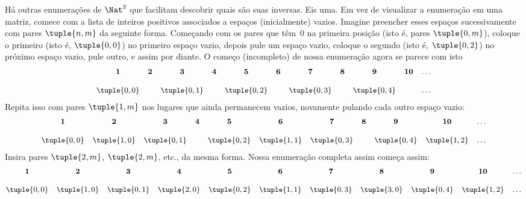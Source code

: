 \documentclass[../../../include/open-logic-section]{subfiles}
\begin{document}


\begin{explain}
Há outras enumerações de $\Nat^2$ que facilitam descobrir
quais são suas inversas. Eis uma. Em vez de
visualizar a enumeração em uma matriz, comece com a lista de
inteiros positivos associados a espaços (inicialmente) vazios. Imagine
preencher esses espaços sucessivamente com pares $\tuple{n,m}$ da seguinte forma.
Começando com os pares que têm~$0$ na primeira posição (isto é, pares
$\tuple{0,m}$), coloque o primeiro (isto é, $\tuple{0,0}$) no primeiro espaço vazio,
depois pule um espaço vazio, coloque o segundo (isto é, $\tuple{0,2}$)
no próximo espaço vazio, pule outro, e assim por diante. O
começo (incompleto) de nossa enumeração agora se parece com isto
\[\small
\begin{array}{@{}c c c c c c c c c c c@{}}
\mathbf 1 & \mathbf 2 & \mathbf 3 & \mathbf 4 & \mathbf 5 & \mathbf 6 & \mathbf 7 & \mathbf 8 & \mathbf 9 & \mathbf{10} & \dots \\ \\
\tuple{0,0} &  & \tuple{0,1} &  & \tuple{0,2} &  & \tuple{0,3} & & \tuple{0,4} &  & \dots \\
\end{array}
\]
Repita isso com pares $\tuple{1,m}$ nos lugares que ainda permanecem
vazios, novamente pulando cada outro espaço vazio:
\[\small
\begin{array}{@{}c c c c c c c c c c c@{}}
\mathbf 1 & \mathbf 2 & \mathbf 3 & \mathbf 4 & \mathbf 5 & \mathbf 6 & \mathbf 7 & \mathbf 8 & \mathbf 9 & \mathbf{10} & \dots \\ \\
\tuple{0,0} & \tuple{1,0} & \tuple{0,1} &  & \tuple{0,2} & \tuple{1,1} & 
\tuple{0,3} & & \tuple{0,4} &  \tuple{1,2} & \dots \\
\end{array}
\]
Insira pares $\tuple{2,m}$, $\tuple{2,m}$, etc., da mesma forma. Nossa
enumeração completa assim começa assim:
\[\small
\begin{array}{@{}cc c c c c c c c c c@{}}
\mathbf 1 & \mathbf 2 & \mathbf 3 & \mathbf 4 & \mathbf 5 & \mathbf 6 & \mathbf 7 & \mathbf 8 & \mathbf 9 & \mathbf{10} & \dots \\ \\
\tuple{0,0} & \tuple{1,0} & \tuple{0,1} & \tuple{2,0}  & \tuple{0,2} & 
\tuple{1,1} & \tuple{0,3} & \tuple{3,0}  & \tuple{0,4} &  \tuple{1,2} & \dots \\

\end{array}\]
\end{explain}
\end{document}
